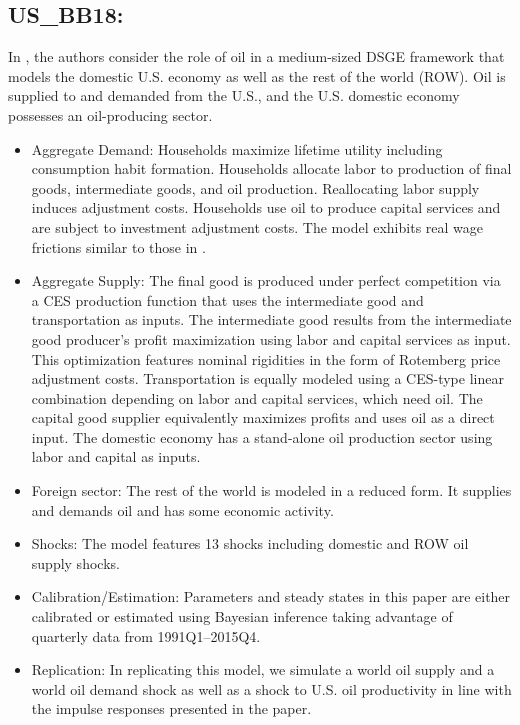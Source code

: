 \documentclass[11pt,a4paper]{article}
\begin{document}
	\subsection{US\_BB18: \cite{balke2018oil}}
\label{USBB18}
In \cite{balke2018oil}, the authors consider the role of oil in a medium-sized DSGE framework that models the domestic U.S. economy as well as the rest of the world (ROW). Oil is supplied to and demanded from the U.S., and the U.S. domestic economy possesses an oil-producing sector.

\begin{itemize}
\item Aggregate Demand: Households maximize lifetime utility including consumption habit formation. Households allocate labor to production of final goods, intermediate goods, and oil production. Reallocating labor supply induces adjustment costs. Households use oil to produce capital services and are subject to investment adjustment costs. The model exhibits real wage frictions similar to those in \cite{blanchard2007macroeconomic}.

\item Aggregate Supply: The final good is produced under perfect competition via a CES production function that uses the intermediate good and transportation as inputs. The intermediate good results from the intermediate good producer’s profit maximization using labor and capital services as input. This optimization features nominal rigidities in the form of Rotemberg price adjustment costs. Transportation is equally modeled using a CES-type linear combination depending on labor and capital services, which need oil. The capital good supplier equivalently maximizes profits and uses oil as a direct input. The domestic economy has a stand-alone oil production sector using labor and capital as inputs.

\item Foreign sector: The rest of the world is modeled in a reduced form. It supplies and demands oil and has some economic activity. 

\item Shocks: The model features 13 shocks including domestic and ROW oil supply shocks.

\item Calibration/Estimation: Parameters and steady states in this paper are either calibrated or estimated using Bayesian inference taking advantage of quarterly data from 1991Q1--2015Q4.

\item Replication: In replicating this model, we simulate a world oil supply and a world oil demand shock as well as a shock to U.S. oil productivity in line with the impulse responses presented in the paper.
\end{itemize}
	
\end{document}
